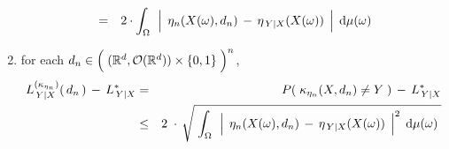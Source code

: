 \begin{theorem}
\begin{enumerate}
\begin{eqnarray*}
	& = &
		2 \cdot \int_{\Omega}\,\;
			\left\vert\;\, \eta_{n}(X(\omega),d_{n}) \,\overset{{\color{white}.}}{-}\, \eta_{\,Y\vert X}(X(\omega)) \;\,\right\vert
			\;\d\mu(\omega)
	\end{eqnarray*}
\item
	for each
	\;$d_{n} \in \left(\;(\Re^{d},\mathcal{O}(\Re^{d})) \overset{{\color{white}.}}{\times} \{0,1\} \;\right)^{n}$,
	\begin{eqnarray*}
	L^{(\kappa_{\eta_{n}})}_{\,Y \vert X}(\,d_{n}\,) \, - \, L^{*}_{\,Y \vert X}
	& = &
		P\!\left(\;\kappa_{\eta_{n}}(X,d_{n}) \neq Y \;\right) \,-\, L^{*}_{\,Y \vert X}
	\\
	& \leq &
		2 \;\cdot\,
		\sqrt{\;\int_{\Omega}\,\;
			\left\vert\;\, \eta_{n}(X(\omega),d_{n}) \,\overset{{\color{white}.}}{-}\, \eta_{\,Y\vert X}(X(\omega)) \;\,\right\vert^{2}
			\;\d\mu(\omega)
			\;}
	\end{eqnarray*}
\end{enumerate}
\end{theorem}
\proof
